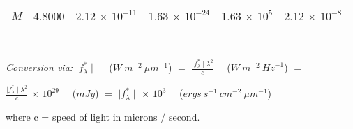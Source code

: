 \documentclass[a4paper]{book}
\renewcommand{\_}{{\tt\char'137}}
\begin{document}
\begin{table}
\begin{center}
\begin{tabular}{|c|c|c|c|c|c|}
$M$  &  4.8000  &  2.12 $\times$ $10^{-11}$ & 1.63 $\times$ $10^{-24}$ & 1.63 $\times$ $10^{5}$ & 2.12 $\times$ $10^{-8}$ \\
\ \ & \ \ & \ \ & \ \ & \ \ & \ \  \\
\hline
\end{tabular}
\vglue 0.3cm
{\em Conversion via: }
$\mid f_{\lambda}^{*} \mid$ \ \ ($W \ m^{-2} \ {\mu m}^{-1}$) $=$
$\frac{\mid f_{\lambda}^{*} \mid \lambda^{2}}{c}$ \ \ ($W \ m^{-2} \ {Hz}^{-1}$) $=$

$\frac{\mid f_{\lambda}^{*} \mid \lambda^{2}}{c}$ $\times$ $10^{29}$  \ \ ($mJy$) $=$
$\mid f_{\lambda}^{*} \mid$ $\times$ $10^{3}$ \ \ ($ergs \ s^{-1} \ cm^{-2} \ {\mu m}^{-1}$)

\vglue 0.1cm

where c = speed of light in microns / second.

\vglue 0.3cm
\end{center}
\end{table}
\end{document}
